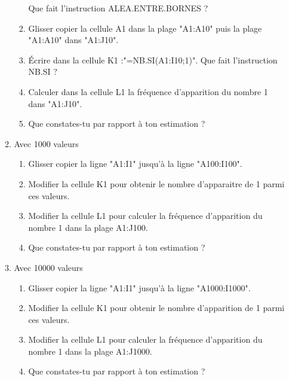 \begin{pageInfo}
\begin{enumerate}[leftmargin=*]
\begin{enumerate}
\begin{enumerate}
Que fait l'instruction ALEA.ENTRE.BORNES ?
\item Glisser copier la cellule A1 dans la plage "A1:A10" puis la plage "A1:A10" dans "A1:J10".
\item Écrire dans la cellule K1 :"=NB.SI(A1:I10;1)". Que fait l'instruction NB.SI ?
\item Calculer dans la cellule L1 la fréquence d'apparition du nombre 1 dans "A1:J10".
\item Que constates-tu par rapport à ton estimation ?
\end{enumerate}
\item Avec 1000 valeurs
\begin{enumerate}
\item Glisser copier la ligne "A1:I1" jusqu'à la ligne "A100:I100".
\item Modifier la cellule K1 pour obtenir le nombre d'apparaitre de 1 parmi ces  valeurs.
\item Modifier la cellule L1 pour calculer la fréquence d'apparition du nombre 1 dans la plage A1:J100.
\item Que constates-tu par rapport à ton estimation ?
\end{enumerate}
\item Avec 10000 valeurs
\begin{enumerate}
\item Glisser copier la ligne "A1:I1" jusqu'à la ligne "A1000:I1000".
\item Modifier la cellule K1 pour obtenir le nombre d'apparition de 1 parmi ces  valeurs.
\item Modifier la cellule L1 pour calculer la fréquence d'apparition du nombre 1 dans la plage A1:J1000.
\item Que constates-tu par rapport à ton estimation ?
\end{enumerate}
\end{enumerate}
\end{enumerate}


\end{pageInfo}
